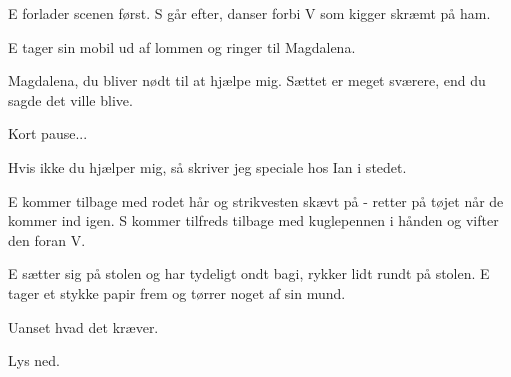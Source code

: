 \documentclass[a4paper,11pt]{article}
\begin{document}
\begin{sketch}
\scene E forlader scenen først. S går efter, danser forbi V som kigger skræmt på ham. 

\scene E tager sin mobil ud af lommen og ringer til Magdalena.

 Magdalena, du bliver nødt til at hjælpe mig. Sættet er meget sværere, end du sagde det ville blive. 

\scene Kort pause...

 Hvis ikke du hjælper mig, så skriver jeg speciale hos Ian i stedet.

\scene E kommer tilbage med rodet hår og strikvesten skævt på - retter på tøjet når de kommer ind igen. S kommer tilfreds tilbage med kuglepennen i hånden og vifter den foran V.

\scene E sætter sig på stolen og har tydeligt ondt bagi, rykker lidt rundt på stolen. E tager et stykke papir frem og tørrer noget af sin mund. 

 Uanset hvad det kræver.

\scene Lys ned.

\end{sketch}
\end{document}
